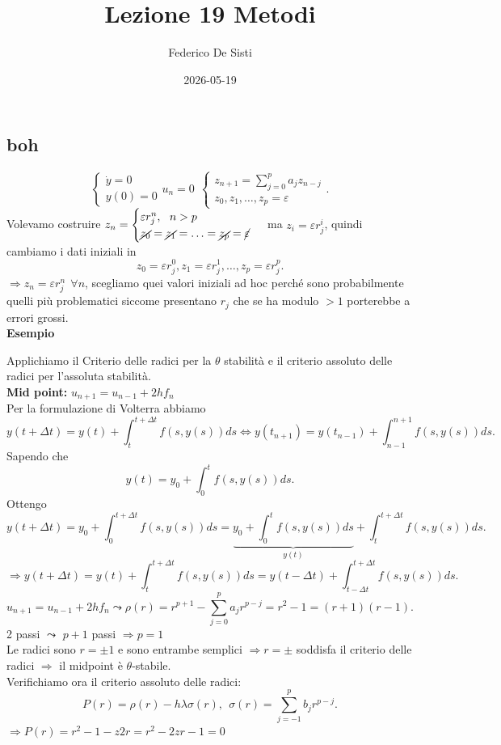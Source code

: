 \documentclass[12px]{article}
\title{Lezione 19 Metodi}
\date{2026-05-19}
\author{Federico De Sisti}
\begin{document}
	\maketitle
	\newpage
	\subsection{boh}
	\[
	\begin{cases}
		\dot y = 0\\
		y(0) = 0
	\end{cases} u_n =0 \ \  \begin{cases}
	z_{n+1} = \sum^{p}_{j=0}a_jz_{n-j}\\
	z_0,z_1,\ldots, z_p = \varepsilon
	\end{cases}
	.\] 
	Volevamo costruire $z_n = \begin{cases}
		\varepsilon r_j^n, \ \ n > p\\
		\cancel{z_0} = \cancel{z_1} = \ldots = \cancel{z_p}= \cancel \varepsilon
	\end{cases}$ ma $z_i = \varepsilon r_j^i$, quindi cambiamo i dati iniziali in \\
	\[
	z_0 = \varepsilon r^0_j, z_1 = \varepsilon r_j^1,\ldots, z_p = \varepsilon r_j^p
	.\] 
	 $ \Rightarrow  z_n = \varepsilon r^n_j \ \ \forall n$, scegliamo quei valori iniziali ad hoc perché sono probabilmente quelli più problematici siccome presentano $r_j$ che se ha modulo $ > 1$ porterebbe a errori grossi.\\
	  \textbf{Esempio}


	  Applichiamo il Criterio delle radici per la $\theta$ stabilità e il criterio assoluto delle radici per l'assoluta stabilità.\\
	  \textbf{Mid point:} $u_{n+1} = u_{n-1} + 2hf_n$\\
	  Per la formulazione di Volterra abbiamo
	   \[ 
		   y(t+\Delta t) = y(t) + \int_t^{t + \Delta t} f(s,y(s))ds \Leftrightarrow y(t_{n+1}) = y(t_{n-1}) + \int_{n-1}^{n+1} f(s,y(s))ds
	  .\] 
	  Sapendo che
	  \[
	  y(t) = y_0 + \int_0^t f(s,y(s))ds
	  .\] 
	  Ottengo
	  \[
		  y(t + \Delta t) = y_0 + \int_0^{t + \Delta t} f(s,y(s))ds = \underbrace{y_0 + \int_0^t f(s,y(s))ds}_{\displaystyle y(t)} + \int_t^{t+\Delta t}f(s,y(s))ds
	  .\] 
	  \[
		  \Rightarrow  y(t+ \Delta t) = y(t) + \int_t^ {t+\Delta t} f(s,y(s))ds = y(t-\Delta t) + \int_{t-\Delta t}^{t+\Delta t}f(s,y(s))ds
	  .\] 
	  \[
		  u_{n+1} = u_{n-1} + 2 h f_n \leadsto \rho(r) = r^ {p+1} - \sum^{p}_{j=0}a_jr^ {p-j} = r^ 2 - 1 = (r+1)(r-1)
	  .\] 
	  2 passi $\leadsto$  $ p + 1$ passi  $ \Rightarrow  p =1$\\
	  Le radici sono $r = \pm 1$  e sono entrambe semplici  $ \Rightarrow  r = \pm $ soddisfa il criterio delle radici $ \Rightarrow  $ il midpoint è $\theta$-stabile.\\
	  Verifichiamo ora il criterio assoluto delle radici:\\
	  \[
		  P(r) = \rho(r) - h\lambda \sigma(r), \ \ \sigma(r) = \sum^{p}_{j=-1}b_jr^{p-j}
	  .\] 
	  $ \Rightarrow P(r) = r^2 - 1 - z 2r = r^2 -  2zr -1 = 0$\\
\end{document}
